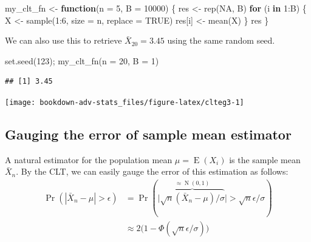 \documentclass[
]{book}
\newenvironment{Shaded}{\begin{snugshade}}{\end{snugshade}}
\newcommand{\AttributeTok}[1]{\textcolor[rgb]{0.77,0.63,0.00}{#1}}
\newcommand{\ConstantTok}[1]{\textcolor[rgb]{0.00,0.00,0.00}{#1}}
\newcommand{\ControlFlowTok}[1]{\textcolor[rgb]{0.13,0.29,0.53}{\textbf{#1}}}
\newcommand{\DecValTok}[1]{\textcolor[rgb]{0.00,0.00,0.81}{#1}}
\newcommand{\FunctionTok}[1]{\textcolor[rgb]{0.00,0.00,0.00}{#1}}
\newcommand{\NormalTok}[1]{#1}
\newcommand{\OtherTok}[1]{\textcolor[rgb]{0.56,0.35,0.01}{#1}}
\newcommand{\SpecialCharTok}[1]{\textcolor[rgb]{0.00,0.00,0.00}{#1}}
\DeclareMathOperator{\E}{E}
\DeclareMathOperator{\N}{N}
\theoremstyle{definition}
\theoremstyle{definition}
\theoremstyle{definition}
\theoremstyle{definition}
\theoremstyle{remark}
\begin{document}
\begin{Shaded}
\begin{Highlighting}[]
\NormalTok{my\_clt\_fn }\OtherTok{\textless{}{-}} \ControlFlowTok{function}\NormalTok{(}\AttributeTok{n =} \DecValTok{5}\NormalTok{, }\AttributeTok{B =} \DecValTok{10000}\NormalTok{) \{}
\NormalTok{  res }\OtherTok{\textless{}{-}} \FunctionTok{rep}\NormalTok{(}\ConstantTok{NA}\NormalTok{, B)}
  \ControlFlowTok{for}\NormalTok{ (i }\ControlFlowTok{in} \DecValTok{1}\SpecialCharTok{:}\NormalTok{B) \{}
\NormalTok{    X }\OtherTok{\textless{}{-}} \FunctionTok{sample}\NormalTok{(}\DecValTok{1}\SpecialCharTok{:}\DecValTok{6}\NormalTok{, }\AttributeTok{size =}\NormalTok{ n, }\AttributeTok{replace =} \ConstantTok{TRUE}\NormalTok{)}
\NormalTok{    res[i] }\OtherTok{\textless{}{-}} \FunctionTok{mean}\NormalTok{(X)}
\NormalTok{  \}}
\NormalTok{  res}
\NormalTok{\}}
\end{Highlighting}
\end{Shaded}

We can also use this to retrieve \(\bar X_{20}=3.45\) using the same random seed.

\begin{Shaded}
\begin{Highlighting}[]
\FunctionTok{set.seed}\NormalTok{(}\DecValTok{123}\NormalTok{); }\FunctionTok{my\_clt\_fn}\NormalTok{(}\AttributeTok{n =} \DecValTok{20}\NormalTok{, }\AttributeTok{B =} \DecValTok{1}\NormalTok{)}
\end{Highlighting}
\end{Shaded}

\begin{verbatim}
## [1] 3.45
\end{verbatim}

\begin{center}\texttt{[image: bookdown-adv-stats\_files/figure-latex/clteg3-1]} \end{center}

\hypertarget{gauging-the-error-of-sample-mean-estimator}{%
\subsection{Gauging the error of sample mean estimator}\label{gauging-the-error-of-sample-mean-estimator}}

A natural estimator for the population mean \(\mu=\E(X_i)\) is the sample mean \(\bar X_n\).
By the CLT, we can easily gauge the error of this estimation as follows:
\[\begin{aligned}
    \Pr(|\bar X_n-\mu| > \epsilon)
    &= \Pr(\big|\overbrace{\sqrt{n}(\bar X_n - \mu)/\sigma}^{\approx\N(0,1)} \big| > \sqrt{n}\epsilon/\sigma) \\
    &\approx 2\big(1-\Phi(\sqrt{n}\epsilon/\sigma)\big)
  \end{aligned}\]
\end{document}
